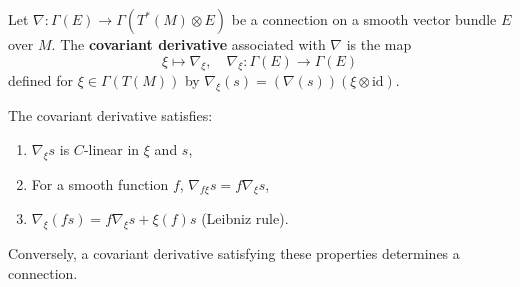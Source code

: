 Let $\nabla: \Gamma(E) \to \Gamma(T^*(M) \otimes E)$ be a connection on a smooth vector bundle $E$ over $M$. The \textbf{covariant derivative} associated with $\nabla$ is the map
$$
\xi \mapsto \nabla_\xi, \quad \nabla_\xi: \Gamma(E) \to \Gamma(E)
$$
defined for $\xi \in \Gamma(T(M))$ by $\nabla_\xi(s) = (\nabla(s))(\xi \otimes \text{id})$.

The covariant derivative satisfies:
\begin{enumerate}
\item $\nabla_\xi s$ is $C$-linear in $\xi$ and $s$,
\item For a smooth function $f$, $\nabla_{f\xi} s = f \nabla_\xi s$,
\item $\nabla_\xi(f s) = f \nabla_\xi s + \xi(f) s$ (Leibniz rule).
\end{enumerate}
Conversely, a covariant derivative satisfying these properties determines a connection.
